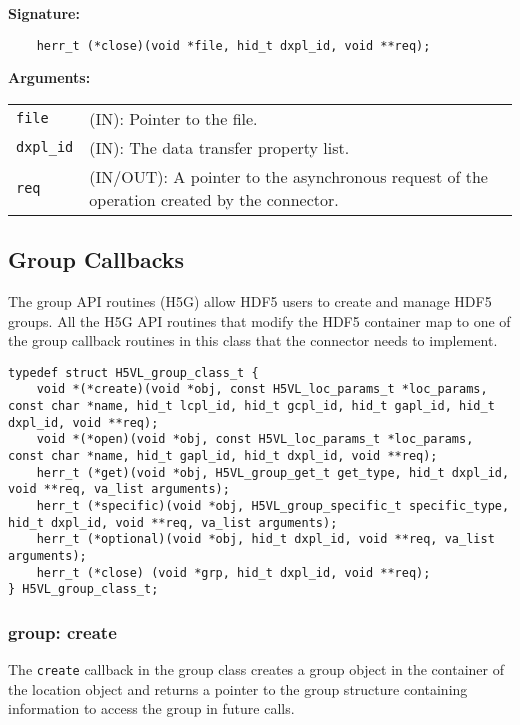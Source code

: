\begin{mdframed}[style=bgbox]
\textbf{Signature:}
\begin{lstlisting}
    herr_t (*close)(void *file, hid_t dxpl_id, void **req);
\end{lstlisting}

\textbf{Arguments:}\\
\begin{tabular}{l p{13.5cm}}
  \texttt{file} & (IN): Pointer to the file.\\
  \texttt{dxpl\_id} & (IN): The data transfer property list.\\
  \texttt{req} & (IN/OUT): A pointer to the asynchronous request of the
  operation created by the connector.\\
\end{tabular}
\end{mdframed}


\subsection{Group Callbacks}
The group API routines (H5G) allow HDF5 users to create and manage
HDF5 groups. All the H5G API routines that modify the HDF5 container
map to one of the group callback routines in this class that the
connector needs to implement.

\begin{lstlisting}[caption={Structure for group callback routines, H5VLconnector.h}, captionpos=b, label={lst:Groupclass}]
typedef struct H5VL_group_class_t {                                              
    void *(*create)(void *obj, const H5VL_loc_params_t *loc_params, const char *name, hid_t lcpl_id, hid_t gcpl_id, hid_t gapl_id, hid_t dxpl_id, void **req);
    void *(*open)(void *obj, const H5VL_loc_params_t *loc_params, const char *name, hid_t gapl_id, hid_t dxpl_id, void **req);
    herr_t (*get)(void *obj, H5VL_group_get_t get_type, hid_t dxpl_id, void **req, va_list arguments);
    herr_t (*specific)(void *obj, H5VL_group_specific_t specific_type, hid_t dxpl_id, void **req, va_list arguments);
    herr_t (*optional)(void *obj, hid_t dxpl_id, void **req, va_list arguments);
    herr_t (*close) (void *grp, hid_t dxpl_id, void **req);
} H5VL_group_class_t; 
\end{lstlisting}

\subsubsection{group: create}
The \texttt{create} callback in the group class creates a group
object in the container of the location object and returns a pointer
to the group structure containing information to access the group in
future calls.\bigskip

